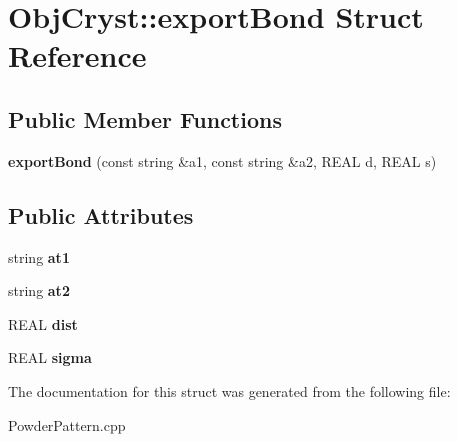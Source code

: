 \hypertarget{struct_obj_cryst_1_1export_bond}{}\section{Obj\+Cryst\+::export\+Bond Struct Reference}
\label{struct_obj_cryst_1_1export_bond}
\subsection*{Public Member Functions}
\begin{DoxyCompactItemize}
\item 
\mbox{\label{struct_obj_cryst_1_1export_bond_a4ccb4fbdf213edc6532cd962144ae6f2}} 
{\bfseries export\+Bond} (const string \&a1, const string \&a2, R\+E\+AL d, R\+E\+AL s)
\end{DoxyCompactItemize}
\subsection*{Public Attributes}
\begin{DoxyCompactItemize}
\item 
\mbox{\label{struct_obj_cryst_1_1export_bond_a3842214946f51458a04dcde948275a0e}} 
string {\bfseries at1}
\item 
\mbox{\label{struct_obj_cryst_1_1export_bond_ad86da4a9973c0fc787095aeeb6125459}} 
string {\bfseries at2}
\item 
\mbox{\label{struct_obj_cryst_1_1export_bond_a52e09e911c4c0f866923ac3cfaed5a5b}} 
R\+E\+AL {\bfseries dist}
\item 
\mbox{\label{struct_obj_cryst_1_1export_bond_aa0a9a36a9d08ff396778c494b10a9ae6}} 
R\+E\+AL {\bfseries sigma}
\end{DoxyCompactItemize}


The documentation for this struct was generated from the following file\+:\begin{DoxyCompactItemize}
\item 
Powder\+Pattern.\+cpp\end{DoxyCompactItemize}
